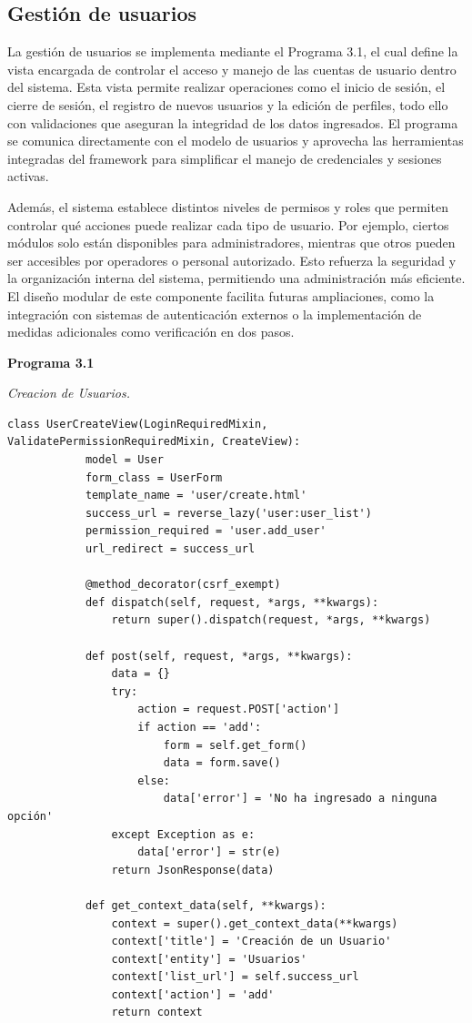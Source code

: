 	\subsection{Gestión de usuarios}
	La gestión de usuarios se implementa mediante el Programa 3.1, el cual define la vista encargada de controlar el acceso y manejo de las cuentas de usuario dentro del sistema. Esta vista permite realizar operaciones como el inicio de sesión, el cierre de sesión, el registro de nuevos usuarios y la edición de perfiles, todo ello con validaciones que aseguran la integridad de los datos ingresados. El programa se comunica directamente con el modelo de usuarios y aprovecha las herramientas integradas del framework para simplificar el manejo de credenciales y sesiones activas.
	
	Además, el sistema establece distintos niveles de permisos y roles que permiten controlar qué acciones puede realizar cada tipo de usuario. Por ejemplo, ciertos módulos solo están disponibles para administradores, mientras que otros pueden ser accesibles por operadores o personal autorizado. Esto refuerza la seguridad y la organización interna del sistema, permitiendo una administración más eficiente. El diseño modular de este componente facilita futuras ampliaciones, como la integración con sistemas de autenticación externos o la implementación de medidas adicionales como verificación en dos pasos.
		
	\textbf{Programa 3.1}
	
	\textit{Creacion de Usuarios.} %
	\vspace{0.3cm} %
	\begin{lstlisting}[lineskip=-1pt]
		class UserCreateView(LoginRequiredMixin, ValidatePermissionRequiredMixin, CreateView):
			model = User
			form_class = UserForm
			template_name = 'user/create.html'
			success_url = reverse_lazy('user:user_list')
			permission_required = 'user.add_user'
			url_redirect = success_url
			
			@method_decorator(csrf_exempt)
			def dispatch(self, request, *args, **kwargs):
				return super().dispatch(request, *args, **kwargs)
			
			def post(self, request, *args, **kwargs):
				data = {}
				try:
					action = request.POST['action']
					if action == 'add':
						form = self.get_form()
						data = form.save()
					else:
						data['error'] = 'No ha ingresado a ninguna opción'
				except Exception as e:
					data['error'] = str(e)
				return JsonResponse(data)
			
			def get_context_data(self, **kwargs):
				context = super().get_context_data(**kwargs)
				context['title'] = 'Creación de un Usuario'
				context['entity'] = 'Usuarios'
				context['list_url'] = self.success_url
				context['action'] = 'add'
				return context
	\end{lstlisting}
	
